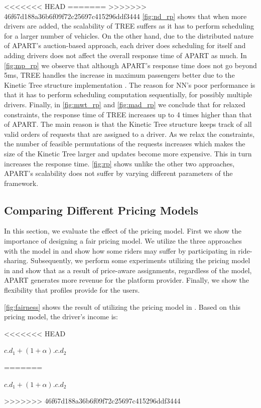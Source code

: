 <<<<<<< HEAD
\vspace{-3mm}
=======
>>>>>>> 46f67d188a36b6f09f72c25697c415296ddf3444
\cref{fig:nd_rp} shows that when more drivers are added, the scalability of TREE suffers as it has to perform scheduling for a larger number of vehicles. On the other hand, due to the distributed nature of APART's auction-based approach, each driver does scheduling for itself and adding drivers does not affect the overall response time of APART as much. In \cref{fig:mp_rp} we observe that although APART's response time does not go beyond 5ms, TREE handles the increase in maximum passengers better due to the Kinetic Tree structure implementation \cite{Huang14}. The reason for NN's poor performance is that it has to perform scheduling computation sequentially, for possibly multiple drivers. Finally, in \cref{fig:mwt_rp} and \cref{fig:mad_rp} we conclude that for relaxed constraints, the response time of TREE increases up to 4 times higher than that of APART. The main reason is that the Kinetic Tree structure keeps track of all valid orders of requests that are assigned to a driver. As we relax the constraints, the number of feasible permutations of the requests increases which makes the size of the Kinetic Tree larger and updates become more expensive. This in turn increases the response time. \cref{fig:rp} shows unlike the other two approaches, APART's scalability does not suffer by varying different parameters of the framework.

\subsection{Comparing Different Pricing Models}
\label{subsec:pricingexp}

In this section, we evaluate the effect of the pricing model. First we show the importance of designing a fair pricing model. We utilize the three approaches with the model in \cite{Ma13} and show how some riders may suffer by participating in ride-sharing. Subsequently, we perform some experiments utilizing the pricing model in \cite{Ma15} and show that as a result of price-aware assignments, regardless of the model, APART generates more revenue for the platform provider. Finally, we show the flexibility that profiles provide for the users. 

\cref{fig:fairness} shows the result of utilizing the pricing model in \cite{Ma13}. Based on this pricing model, the driver's income is:

<<<<<<< HEAD
\vspace{-2mm}
\begin{center}
$c.d_1 + (1+\alpha).c.d_2$
\end{center}
\vspace{-2mm}
=======
\begin{center}
$c.d_1 + (1+\alpha).c.d_2$
\end{center}
>>>>>>> 46f67d188a36b6f09f72c25697c415296ddf3444

